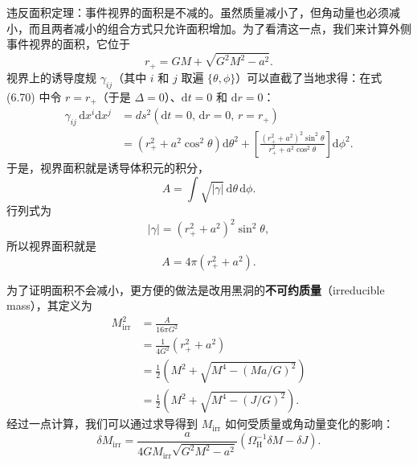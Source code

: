 
违反面积定理：事件视界的面积是不减的。虽然质量减小了，但角动量也必须减小，而且两者减小的组合方式只允许面积增加。为了看清这一点，我们来计算外侧事件视界的面积，它位于
\begin{equation*}
r_{+} = GM + \sqrt{G^{2}M^{2}-a^{2}}.
\tag{6.105}
\end{equation*}
视界上的诱导度规 $\gamma_{ij}$（其中 $i$ 和 $j$ 取遍 $\{\theta,\phi\}$）可以直截了当地求得：在式 (6.70) 中令 $r=r_{+}$（于是 $\Delta=0$）、$\mathrm{d}t=0$ 和 $\mathrm{d}r=0$：
\begin{align*}
\gamma_{ij}\,\mathrm{d}x^{i}\mathrm{d}x^{j} &= ds^{2}(\mathrm{d}t=0,\,\mathrm{d}r=0,\,r=r_{+})\\
&= (r_{+}^{2}+a^{2}\cos^{2}\theta)\mathrm{d}\theta^{2} + \left[\frac{(r_{+}^{2}+a^{2})^{2}\sin^{2}\theta}{r_{+}^{2}+a^{2}\cos^{2}\theta}\right]\mathrm{d}\phi^{2}.
\tag{6.106}
\end{align*}
于是，视界面积就是诱导体积元的积分，
\begin{equation*}
A = \int\sqrt{|\gamma|}\,\mathrm{d}\theta\,\mathrm{d}\phi.
\tag{6.107}
\end{equation*}
行列式为
\begin{equation*}
|\gamma| = (r_{+}^{2}+a^{2})^{2}\sin^{2}\theta,
\tag{6.108}
\end{equation*}
所以视界面积就是
\begin{equation*}
A = 4\pi(r_{+}^{2}+a^{2}).
\tag{6.109}
\end{equation*}

为了证明面积不会减小，更方便的做法是改用黑洞的\textbf{不可约质量}（irreducible mass），其定义为
\begin{align*}
M_{\mathrm{irr}}^{2} &= \frac{A}{16\pi G^{2}}\\
&= \frac{1}{4G^{2}}(r_{+}^{2}+a^{2})\\
&= \frac{1}{2}\left(M^{2}+\sqrt{M^{4}-(Ma/G)^{2}}\right)\\
&= \frac{1}{2}\left(M^{2}+\sqrt{M^{4}-(J/G)^{2}}\right).
\tag{6.110}
\end{align*}
经过一点计算，我们可以通过求导得到 $M_{\mathrm{irr}}$ 如何受质量或角动量变化的影响：
\begin{equation*}
\delta M_{\mathrm{irr}} = \frac{a}{4GM_{\mathrm{irr}}\sqrt{G^{2}M^{2}-a^{2}}}\left(\Omega_{\mathrm{H}}^{-1}\delta M - \delta J\right).
\tag{6.111}
\end{equation*}


